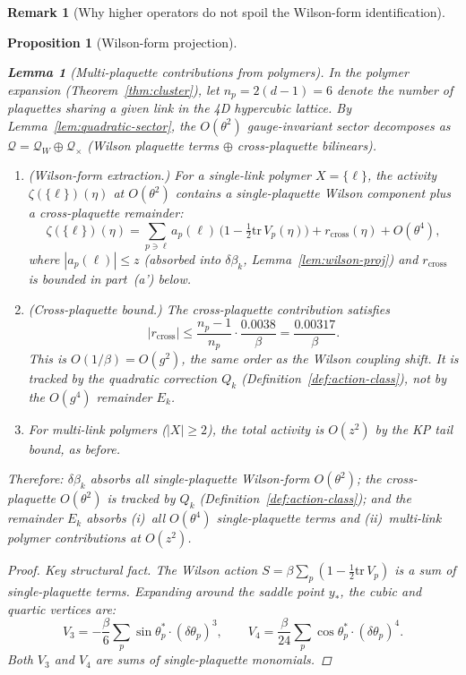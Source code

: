 \documentclass[11pt]{article}
\newtheorem{lemma}[theorem]{Lemma}
\newtheorem{proposition}[theorem]{Proposition}
\theoremstyle{definition}
\newtheorem{remark}[theorem]{Remark}
\newcommand{\tr}{\mathrm{tr}}
\begin{document}
\begin{remark}[Why higher operators do not spoil the Wilson-form identification]
\begin{proposition}[Wilson-form projection]
\begin{enumerate}[nosep,label=(\roman*)]
\begin{lemma}[Multi-plaquette contributions from
polymers]\label{lem:multi-plaq}
In the polymer expansion (Theorem~\ref{thm:cluster}),
let $n_p=2(d{-}1)=6$ denote the number of plaquettes sharing
a given link in the 4D hypercubic lattice.
By Lemma~\ref{lem:quadratic-sector}, the $O(\theta^2)$
gauge-invariant sector decomposes as
$\mathcal{Q}=\mathcal{Q}_W\oplus\mathcal{Q}_\times$
(Wilson plaquette terms $\oplus$ cross-plaquette bilinears).
\begin{enumerate}[nosep,label=(\alph*)]
\item \emph{(Wilson-form extraction.)}
For a single-link polymer $X=\{\ell\}$, the activity
$\zeta(\{\ell\})(\eta)$ at $O(\theta^2)$ contains a
single-plaquette Wilson component plus a cross-plaquette
remainder:
\begin{equation}\label{eq:single-link-decomp}
\zeta(\{\ell\})(\eta)
=\sum_{p\ni\ell}a_p(\ell)\,
\bigl(1-\tfrac{1}{2}\tr\,V_p(\eta)\bigr)
+r_{\mathrm{cross}}(\eta)
+O(\theta^4),
\end{equation}
where $|a_p(\ell)|\le z$ (absorbed into $\delta\beta_k$,
Lemma~\ref{lem:wilson-proj}) and $r_{\mathrm{cross}}$
is bounded in part~(a') below.
\item[(a')] \emph{(Cross-plaquette bound.)}
The cross-plaquette contribution satisfies
\begin{equation}\label{eq:cross-bound}
|r_{\mathrm{cross}}|\le\frac{n_p{-}1}{n_p}
\cdot\frac{0.0038}{\beta}
=\frac{0.00317}{\beta}.
\end{equation}
This is $O(1/\beta)=O(g^2)$, the same order as the Wilson
coupling shift.  It is tracked by the quadratic
correction $Q_k$ (Definition~\ref{def:action-class}),
not by the $O(g^4)$ remainder $E_k$.
\item[(b)] For multi-link polymers ($|X|\ge 2$), the total activity
is $O(z^2)$ by the KP tail bound, as before.
\end{enumerate}
Therefore: $\delta\beta_k$ absorbs all single-plaquette Wilson-form
$O(\theta^2)$; the cross-plaquette $O(\theta^2)$ is tracked by
$Q_k$ (Definition~\ref{def:action-class}); and the remainder $E_k$
absorbs (i)~all $O(\theta^4)$ single-plaquette terms and
(ii)~multi-link polymer contributions at $O(z^2)$.
\end{lemma}

\begin{proof}
\emph{Key structural fact.}  The Wilson action
$S=\beta\sum_p(1-\frac{1}{2}\tr\,V_p)$ is a sum of
single-plaquette terms.  Expanding around the
saddle point $y_*$, the cubic and quartic vertices are:
\begin{equation}
V_3=-\frac{\beta}{6}\sum_p\sin\theta_p^*\cdot(\delta\theta_p)^3,
\qquad
V_4=\frac{\beta}{24}\sum_p\cos\theta_p^*\cdot(\delta\theta_p)^4.
\end{equation}
Both $V_3$ and $V_4$ are sums of single-plaquette monomials.


\end{proof}
\end{enumerate}
\end{proposition}
\end{remark}
\end{document}
